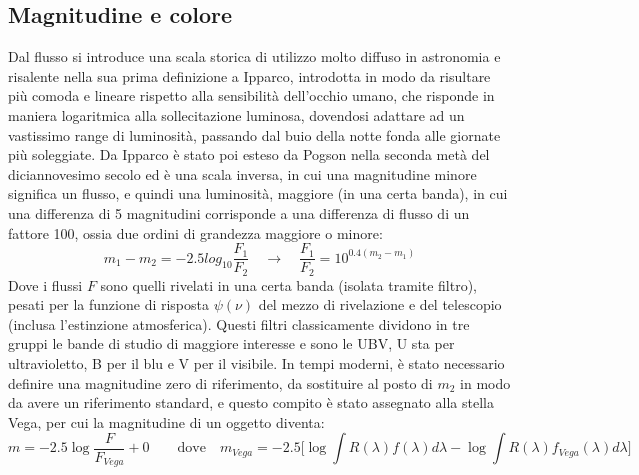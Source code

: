 \documentclass[a4paper,twoside,openany,notitlepage]{book}
\theoremstyle{definition}
\theoremstyle{plain}
\begin{document}
\subsection*{Magnitudine e colore}
Dal flusso si introduce una scala storica di utilizzo molto diffuso in astronomia e risalente nella sua prima definizione a Ipparco, introdotta in modo da risultare più comoda e lineare rispetto alla sensibilità dell'occhio umano, che risponde in maniera logaritmica alla sollecitazione luminosa, dovendosi adattare ad un vastissimo range di luminosità, passando dal buio della notte fonda alle giornate più soleggiate. Da Ipparco è stato poi esteso da Pogson nella seconda metà del diciannovesimo secolo ed è una scala inversa, in cui una magnitudine minore significa un flusso, e quindi una luminosità, maggiore (in una certa banda), in cui una differenza di 5 magnitudini corrisponde a una differenza di flusso di un fattore 100, ossia due ordini di grandezza maggiore o minore:
\begin{equation*}
	m_1-m_2 = -2.5log_{10}\frac{F_1}{F_2} \quad \longrightarrow \quad \frac{F_1}{F_2} = 10^{0.4(m_2-m_1)}
\end{equation*}
Dove i flussi $F$ sono quelli rivelati in una certa banda (isolata tramite filtro), pesati per la funzione di risposta $\psi(\nu)$ del mezzo di rivelazione e del telescopio (inclusa l'estinzione atmosferica). Questi filtri classicamente dividono in tre gruppi le bande di studio di maggiore interesse e sono le UBV, U sta per ultravioletto, B per il blu e V per il visibile.
In tempi moderni, è stato necessario definire una magnitudine zero di riferimento, da sostituire al posto di $m_2$ in modo da avere un riferimento standard, e questo compito è stato assegnato alla stella Vega, per cui la magnitudine di un oggetto diventa:
\begin{equation*}
	m = -2.5\log\frac{F}{F_{Vega}} + 0 \qquad \text{dove} \quad
	m_{Vega} = -2.5 \biggl[ \log\int R(\lambda)f(\lambda)d\lambda - \log\int R(\lambda)f_{Vega}(\lambda)d\lambda \biggr]
\end{equation*}
\end{document}
